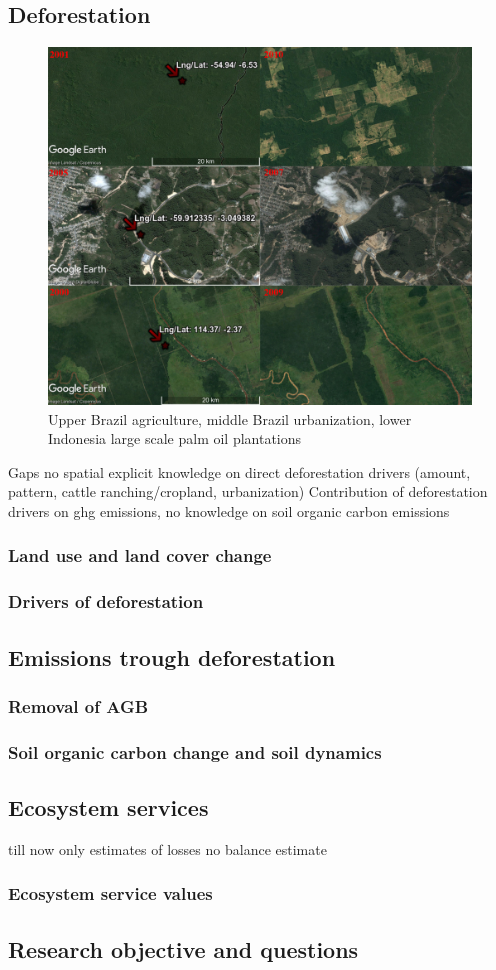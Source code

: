 \subsection{Deforestation}
	\begin{figure}[ht]
		\centering
		\includegraphics[scale=0.6]{img/deforestation_examples}
		\caption[Deforestation examples]{Upper Brazil agriculture, middle Brazil urbanization, lower Indonesia large scale palm oil plantations}
		\label{fig:deforestationexamples}
	\end{figure}

	{\color{red} Gaps no spatial explicit knowledge on direct deforestation drivers (amount, pattern, cattle ranching/cropland, urbanization)}
	{\color{red} Contribution of deforestation drivers on ghg emissions, no knowledge on soil organic carbon emissions}
 
	\subsubsection{Land use and land cover change}
	\subsubsection{Drivers of deforestation}
	\subsection{Emissions trough deforestation}
	\subsubsection{Removal of AGB}
	\subsubsection{Soil organic carbon change and soil dynamics}

\subsection{Ecosystem services}
	{\color{red} till now only estimates of losses no balance estimate} 
	\subsubsection{Ecosystem service values}
	\subsection{Research objective and questions}
